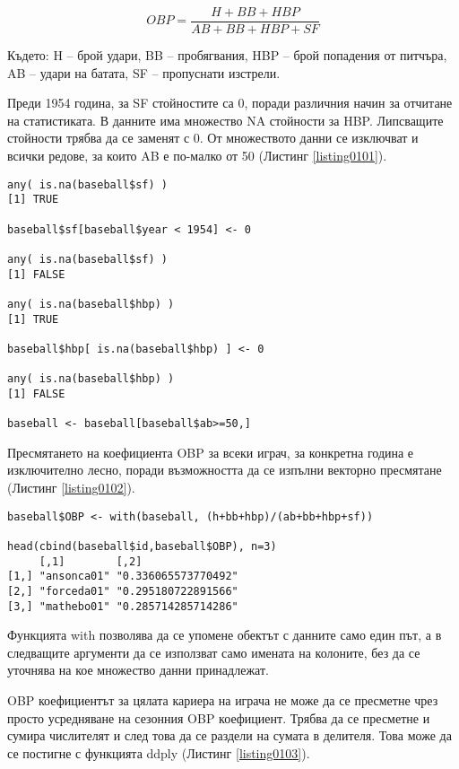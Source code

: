\begin{equation}
OBP = \frac{H + BB + HBP}{AB + BB + HBP + SF}
\label{equation0001}
\end{equation}

Където:
H – брой удари,
BB – пробягвания,
HBP – брой попадения от питчъра,
AB – удари на батата,
SF – пропуснати изстрели.

Преди 1954 година, за SF стойностите са 0, поради различния начин за отчитане на статистиката. В данните има множество NA стойности за HBP. Липсващите стойности трябва да се заменят с 0. От множеството данни се изключват и всички редове, за които AB е по-малко от 50 (Листинг \ref{listing0101}).

\begin{lstlisting}[caption=Корекция на данните, label=listing0101]
any( is.na(baseball$sf) )
[1] TRUE

baseball$sf[baseball$year < 1954] <- 0

any( is.na(baseball$sf) )
[1] FALSE

any( is.na(baseball$hbp) )
[1] TRUE
 
baseball$hbp[ is.na(baseball$hbp) ] <- 0
 
any( is.na(baseball$hbp) )
[1] FALSE

baseball <- baseball[baseball$ab>=50,]
\end{lstlisting}

Пресмятането на коефициента OBP за всеки играч, за конкретна година е изключително лесно, поради възможността да се изпълни векторно пресмятане (Листинг \ref{listing0102}).

\begin{lstlisting}[caption=Пресмятане на OBP, label=listing0102]
baseball$OBP <- with(baseball, (h+bb+hbp)/(ab+bb+hbp+sf))

head(cbind(baseball$id,baseball$OBP), n=3)
     [,1]        [,2]               
[1,] "ansonca01" "0.336065573770492"
[2,] "forceda01" "0.295180722891566"
[3,] "mathebo01" "0.285714285714286"
\end{lstlisting}


Функцията with позволява да се упомене обектът с данните само един път, а в следващите аргументи да се използват само имената на колоните, без да се уточнява на кое множество данни принадлежат.

OBP коефициентът за цялата кариера на играча не може да се пресметне чрез просто усредняване на сезонния OBP коефициент. Трябва да се пресметне и сумира числителят и след това да се раздели на сумата в делителя. Това може да се постигне с функцията ddply (Листинг \ref{listing0103}).

